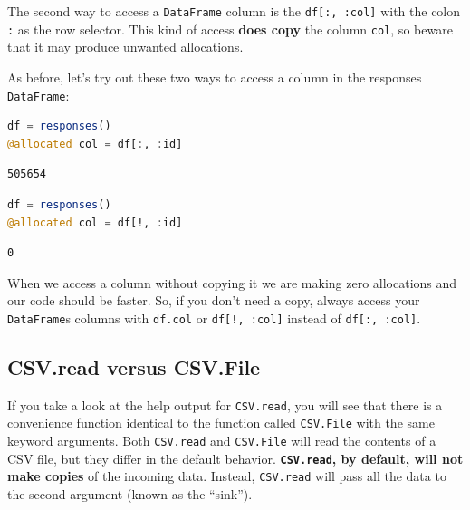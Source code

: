 \documentclass[
  notoc %
]{tufte-book}
\newcommand{\passthrough}[1]{#1}
\begin{document}
The second way to access a \passthrough{\lstinline!DataFrame!} column is
the \passthrough{\lstinline!df[:, :col]!} with the colon
\passthrough{\lstinline!:!} as the row selector. This kind of access
\textbf{does copy} the column \passthrough{\lstinline!col!}, so beware
that it may produce unwanted allocations.

As before, let's try out these two ways to access a column in the
responses \passthrough{\lstinline!DataFrame!}:

\begin{lstlisting}[language=Julia]
df = responses()
@allocated col = df[:, :id]
\end{lstlisting}

\begin{lstlisting}
505654
\end{lstlisting}

\begin{lstlisting}[language=Julia]
df = responses()
@allocated col = df[!, :id]
\end{lstlisting}

\begin{lstlisting}
0
\end{lstlisting}

When we access a column without copying it we are making zero
allocations and our code should be faster. So, if you don't need a copy,
always access your \passthrough{\lstinline!DataFrame!}s columns with
\passthrough{\lstinline!df.col!} or
\passthrough{\lstinline"df[!, :col]"} instead of
\passthrough{\lstinline!df[:, :col]!}.

\hypertarget{sec:df_performance_csv_read_file}{%
\subsection{CSV.read versus
CSV.File}\label{sec:df_performance_csv_read_file}}

If you take a look at the help output for
\passthrough{\lstinline!CSV.read!}, you will see that there is a
convenience function identical to the function called
\passthrough{\lstinline!CSV.File!} with the same keyword arguments. Both
\passthrough{\lstinline!CSV.read!} and
\passthrough{\lstinline!CSV.File!} will read the contents of a CSV file,
but they differ in the default behavior.
\textbf{\passthrough{\lstinline!CSV.read!}, by default, will not make
copies} of the incoming data. Instead,
\passthrough{\lstinline!CSV.read!} will pass all the data to the second
argument (known as the ``sink'').
\end{document}
